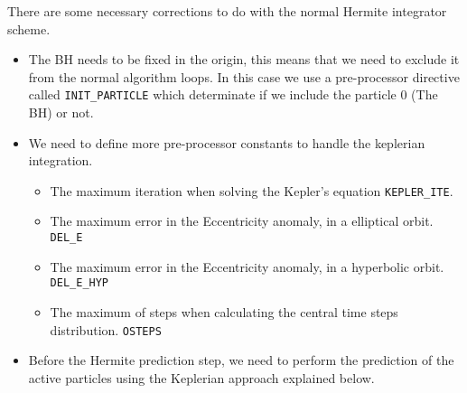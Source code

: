 There are some necessary corrections to do with the normal Hermite integrator scheme.  \begin{itemize} \item The BH needs to be fixed in the origin, this means that we need to
          exclude it from the normal algorithm loops.
          In this case we use a pre-processor directive called
          \texttt{INIT\_PARTICLE} which determinate if we include the particle $0$
          (The BH) or not.
    \item We need to define more pre-processor constants to handle the keplerian
          integration.
          \begin{itemize}
              \item The maximum iteration when solving the Kepler's equation
                    \texttt{KEPLER\_ITE}.
              \item The maximum error in the Eccentricity anomaly, in a elliptical
                    orbit. \texttt{DEL\_E}
              \item The maximum error in the Eccentricity anomaly, in a hyperbolic
                    orbit. \texttt{DEL\_E\_HYP}
              \item The maximum of steps when calculating the central time steps
                    distribution. \texttt{OSTEPS}
          \end{itemize}
    \item Before the Hermite prediction step, we need to perform the prediction
          of the active particles using the Keplerian approach explained below.
\end{itemize}

